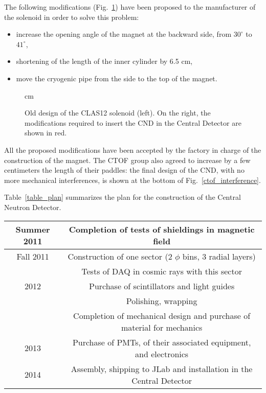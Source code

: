 \documentclass[12pt,oneside]{article}
\begin{document}
{The following modifications (Fig.~\ref{magnet_modifications}) have been proposed to the manufacturer of the solenoid in order to solve this problem:
\begin{itemize}
\item{increase the opening angle of the magnet at the backward side, from $30^{\circ}$ to $41^{\circ}$,}
\item{shortening of the length of the inner cylinder by 6.5 cm,}
\item{move the cryogenic pipe from the side to the top of the magnet.}
\end{itemize}

\begin{figure}[h] 
\vspace{-2cm}
\begin{center}
 cm
\caption{Old design of the CLAS12 solenoid (left). On the right, the modifications required to insert the CND in the Central Detector are shown in red.}
\label{magnet_modifications}
\end{center}
\end{figure}

All the proposed modifications have been accepted by the factory in charge of the construction of the magnet. The CTOF group also agreed to increase by a few centimeters the length of their paddles: the final design of the CND, with no more mechanical interferences, is shown at the bottom of Fig.~\ref{ctof_interference}.

Table~\ref{table_plan} summarizes the plan for the construction of the Central Neutron Detector. 

\begin{table}
\begin{center}
\begin{tabular}{|c|c|}
\hline
Summer 2011 & Completion of tests of shieldings in magnetic field\\
\hline
Fall 2011 & Construction of one sector (2 $\phi$ bins, 3 radial layers)\\
 & Tests of DAQ in cosmic rays with this sector\\
\hline
2012 & Purchase of scintillators and light guides\\
& Polishing, wrapping\\
& Completion of mechanical design and purchase of material for mechanics\\
\hline
2013 & Purchase of PMTs, of their associated equipment, and electronics\\
\hline
2014 & Assembly, shipping to JLab and installation in the Central Detector\\
\hline


\end{tabular}
\end{center}
\end{table}}
\end{document}
